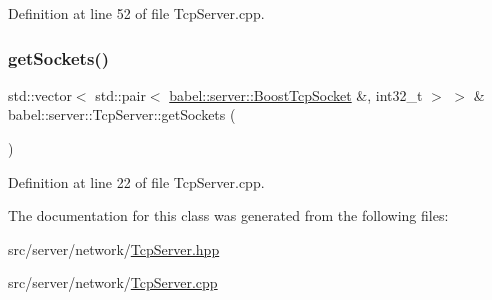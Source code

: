 Definition at line 52 of file Tcp\+Server.\+cpp.

\mbox{\label{classbabel_1_1server_1_1_tcp_server_a0229ce4a4e3288b644915c8a98820eb7}} 
\subsubsection{\texorpdfstring{get\+Sockets()}{getSockets()}}
{\footnotesize\ttfamily std\+::vector$<$ std\+::pair$<$ \mbox{\hyperlink{classbabel_1_1server_1_1_boost_tcp_socket}{babel\+::server\+::\+Boost\+Tcp\+Socket}} \&, int32\+\_\+t $>$ $>$ \& babel\+::server\+::\+Tcp\+Server\+::get\+Sockets (\begin{DoxyParamCaption}{ }\end{DoxyParamCaption})}



Definition at line 22 of file Tcp\+Server.\+cpp.



The documentation for this class was generated from the following files\+:\begin{DoxyCompactItemize}
\item 
src/server/network/\mbox{\hyperlink{_tcp_server_8hpp}{Tcp\+Server.\+hpp}}\item 
src/server/network/\mbox{\hyperlink{_tcp_server_8cpp}{Tcp\+Server.\+cpp}}\end{DoxyCompactItemize}

